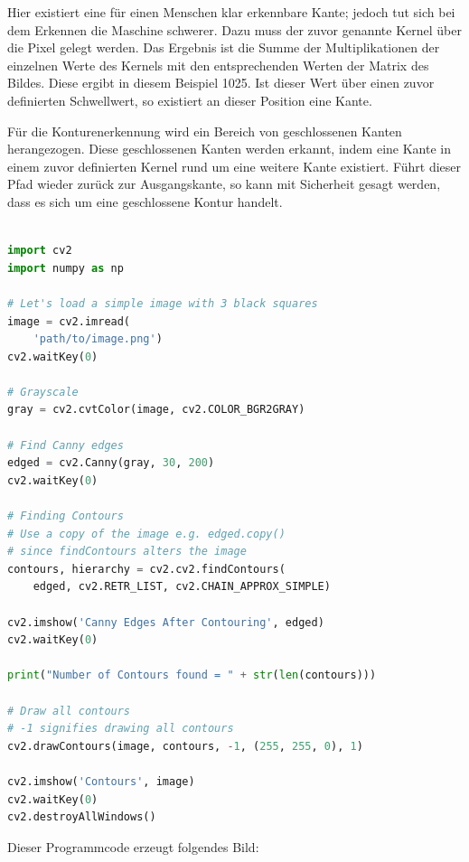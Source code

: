 Hier existiert eine für einen Menschen klar erkennbare Kante; jedoch tut sich bei dem Erkennen die Maschine schwerer. Dazu muss der zuvor genannte Kernel über die Pixel gelegt werden. Das Ergebnis ist die Summe der Multiplikationen der einzelnen Werte des Kernels mit den entsprechenden Werten der Matrix des Bildes. Diese ergibt in diesem Beispiel 1025. Ist dieser Wert über einen zuvor definierten Schwellwert, so existiert an dieser Position eine Kante.

Für die Konturenerkennung wird ein Bereich von geschlossenen Kanten herangezogen. Diese geschlossenen Kanten werden erkannt, indem eine Kante in einem zuvor definierten Kernel rund um eine weitere Kante existiert. Führt dieser Pfad wieder zurück zur Ausgangskante, so kann mit Sicherheit gesagt werden, dass es sich um eine geschlossene Kontur handelt.



\begin{lstlisting}[caption=Adaptive Gaussian Thresholding,language=Python,label=maai:gaussianthresholding]
    
import cv2
import numpy as np

# Let's load a simple image with 3 black squares
image = cv2.imread(
    'path/to/image.png')
cv2.waitKey(0)

# Grayscale
gray = cv2.cvtColor(image, cv2.COLOR_BGR2GRAY)

# Find Canny edges
edged = cv2.Canny(gray, 30, 200)
cv2.waitKey(0)

# Finding Contours
# Use a copy of the image e.g. edged.copy()
# since findContours alters the image
contours, hierarchy = cv2.cv2.findContours(
    edged, cv2.RETR_LIST, cv2.CHAIN_APPROX_SIMPLE)

cv2.imshow('Canny Edges After Contouring', edged)
cv2.waitKey(0)

print("Number of Contours found = " + str(len(contours)))

# Draw all contours
# -1 signifies drawing all contours
cv2.drawContours(image, contours, -1, (255, 255, 0), 1)

cv2.imshow('Contours', image)
cv2.waitKey(0)
cv2.destroyAllWindows()

\end{lstlisting}

Dieser Programmcode erzeugt folgendes Bild:



